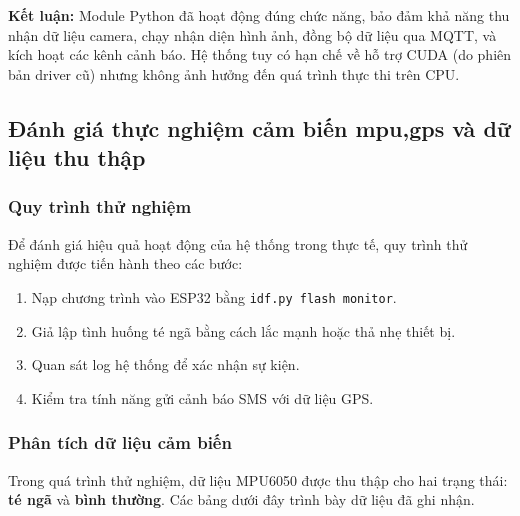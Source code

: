 \textbf{Kết luận:} Module Python đã hoạt động đúng chức năng, bảo đảm khả năng thu nhận dữ liệu camera, chạy nhận diện hình ảnh, đồng bộ dữ liệu qua MQTT, và kích hoạt các kênh cảnh báo. Hệ thống tuy có hạn chế về hỗ trợ CUDA (do phiên bản driver cũ) nhưng không ảnh hưởng đến quá trình thực thi trên CPU.

\subsection{Đánh giá thực nghiệm cảm biến mpu,gps và dữ liệu thu thập}
\subsubsection*{Quy trình thử nghiệm}
Để đánh giá hiệu quả hoạt động của hệ thống trong thực tế, quy trình thử nghiệm được tiến hành theo các bước:
\begin{enumerate}
    \item Nạp chương trình vào ESP32 bằng \texttt{idf.py flash monitor}.  
    \item Giả lập tình huống té ngã bằng cách lắc mạnh hoặc thả nhẹ thiết bị.  
    \item Quan sát log hệ thống để xác nhận sự kiện.  
    \item Kiểm tra tính năng gửi cảnh báo SMS với dữ liệu GPS.  
\end{enumerate}

\subsubsection*{Phân tích dữ liệu cảm biến}
Trong quá trình thử nghiệm, dữ liệu MPU6050 được thu thập cho hai trạng thái: \textbf{té ngã} và \textbf{bình thường}.  
Các bảng dưới đây trình bày dữ liệu đã ghi nhận.


